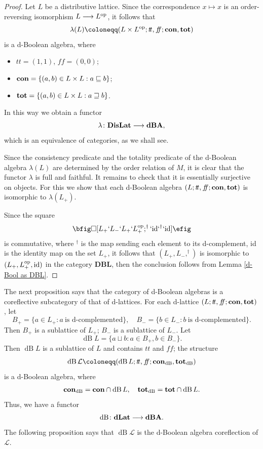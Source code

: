 \documentclass[11pt]{article}
\DeclareMathOperator{\dB}{dB}
\theoremstyle{plain}
\theoremstyle{definition}
\newcommand{\dbt}{{t\!t}}
\newcommand{\dbf}{{f\!\!f}}
\newcommand{\dLat}{\bf dLat}
\newcommand{\dBoo}{\bf dBA}
\newcommand{\lra}{\longrightarrow}
\begin{document}
\begin{proof} 
Let $L$ be a distributive lattice. Since the correspondence  $x\mapsto x$ is an order-reversing isomorphism $L\lra L^{\rm op}$,  it follows that $$\lambda(L)\coloneqq (L\times L^{\rm op} ;\dbt,\dbf;{\bf con},{\bf tot})$$ is a d-Boolean algebra, where  \begin{itemize} \setlength{\itemsep}{0pt} 
\item $\dbt=(1,1)$, $\dbf=(0,0)$; \item ${\bf con}=\{(a,b)\in L\times L: a\sqsubseteq b\}$;   \item ${\bf tot}=\{(a,b)\in L\times L: a\sqsupseteq b\}$. \end{itemize} \begin{center}
 \end{center}  

In this way we obtain a functor  $$\lambda\colon{\bf DisLat}\lra\dBoo,$$ which is an equivalence of categories, as we shall see.  

Since the consistency predicate and the totality predicate  of the d-Boolean algebra $\lambda(L)$ are  determined by the order relation of $M$, it is clear that the functor $\lambda$ is full and faithful. It remains to check that it is essentially surjective on objects.  For this we show that each d-Boolean algebra $(L;\dbt,\dbf;{\bf con},{\bf tot})$ is isomorphic to $\lambda(L_+)$.

Since the square  $$ \bfig \square[L_+`L_-`L_+`L_+^{\rm op}; ^\dag`{\rm id}`^\dag`{\rm id}] \efig$$ is commutative,  where $ ^\dag$ is the map sending each element to its d-complement,   {\rm id} is the identity map on the set $L_+$, it follows that $(L_+,L_-,^\dag)$ is isomorphic to $(L_+,L_+^{\rm op},{\rm id})$ in the category {\bf DBL}, then the conclusion follows from Lemma \ref{d-Bool as DBL}. \end{proof} 
  
The next proposition says that the category of d-Boolean algebras is a coreflective  subcategory of that of d-lattices. 
For each d-lattice $(L;\dbt,\dbf;{\bf con},{\bf tot})$, let $$B_+=\{a\in L_+: a~\text{is d-complemented}\}, \quad B_-=\{b\in L_-: b~\text{is d-complemented}\}.$$ Then  $B_+$ is a sublattice of $L_+$;   $B_-$ is a sublattice  of $L_-$.  
Let $$\dB L=\{a\sqcup b: a\in B_+,b\in B_-\}. $$ Then $\dB L$ is a sublattice of $L$ and contains $\dbt$ and $\dbf$; the structure $$\dB\mathcal{L}\coloneqq(\dB L;\dbt,\dbf;{\bf con}_{\dB},{\bf tot}_{\dB})$$ is a d-Boolean algebra,  where $${\bf con}_{\dB}={\bf con}\cap \dB L, \quad {\bf tot}_{\dB}={\bf tot}\cap \dB L.$$ 
Thus, we have a functor $$\dB\colon \dLat \longrightarrow \dBoo.$$
The following proposition says that $\dB\mathcal{L}$ is the d-Boolean algebra coreflection of  $\mathcal{L}$.   
\end{document}
